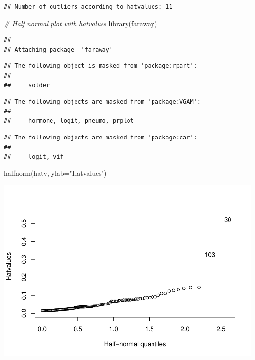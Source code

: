 \documentclass[
]{article}
\newenvironment{Shaded}{\begin{snugshade}}{\end{snugshade}}
\newcommand{\AttributeTok}[1]{\textcolor[rgb]{0.77,0.63,0.00}{#1}}
\newcommand{\CommentTok}[1]{\textcolor[rgb]{0.56,0.35,0.01}{\textit{#1}}}
\newcommand{\FunctionTok}[1]{\textcolor[rgb]{0.00,0.00,0.00}{#1}}
\newcommand{\NormalTok}[1]{#1}
\newcommand{\StringTok}[1]{\textcolor[rgb]{0.31,0.60,0.02}{#1}}
\begin{document}
\begin{verbatim}
## Number of outliers according to hatvalues: 11
\end{verbatim}

\begin{Shaded}
\begin{Highlighting}[]
\CommentTok{\# Half normal plot with hatvalues}
\FunctionTok{library}\NormalTok{(faraway)}
\end{Highlighting}
\end{Shaded}

\begin{verbatim}
## 
## Attaching package: 'faraway'
\end{verbatim}

\begin{verbatim}
## The following object is masked from 'package:rpart':
## 
##     solder
\end{verbatim}

\begin{verbatim}
## The following objects are masked from 'package:VGAM':
## 
##     hormone, logit, pneumo, prplot
\end{verbatim}

\begin{verbatim}
## The following objects are masked from 'package:car':
## 
##     logit, vif
\end{verbatim}

\begin{Shaded}
\begin{Highlighting}[]
\FunctionTok{halfnorm}\NormalTok{(hatv, }\AttributeTok{ylab=}\StringTok{"Hatvalues"}\NormalTok{)}
\end{Highlighting}
\end{Shaded}

\includegraphics{code_files/figure-latex/unnamed-chunk-22-1.pdf}
\end{document}
